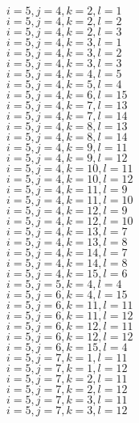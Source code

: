 \documentclass[14pt]{article}
\begin{document}
    $i=5,j=4,k=2,l=1 $ \\ 
    $i=5,j=4,k=2,l=2 $ \\ 
    $i=5,j=4,k=2,l=3 $ \\ 
    $i=5,j=4,k=3,l=1 $ \\ 
    $i=5,j=4,k=3,l=2 $ \\ 
    $i=5,j=4,k=3,l=3 $ \\ 
    $i=5,j=4,k=4,l=5 $ \\ 
    $i=5,j=4,k=5,l=4 $ \\ 
    $i=5,j=4,k=6,l=15 $ \\ 
    $i=5,j=4,k=7,l=13 $ \\ 
    $i=5,j=4,k=7,l=14 $ \\ 
    $i=5,j=4,k=8,l=13 $ \\ 
    $i=5,j=4,k=8,l=14 $ \\ 
    $i=5,j=4,k=9,l=11 $ \\ 
    $i=5,j=4,k=9,l=12 $ \\ 
    $i=5,j=4,k=10,l=11 $ \\ 
    $i=5,j=4,k=10,l=12 $ \\ 
    $i=5,j=4,k=11,l=9 $ \\ 
    $i=5,j=4,k=11,l=10 $ \\ 
    $i=5,j=4,k=12,l=9 $ \\ 
    $i=5,j=4,k=12,l=10 $ \\ 
    $i=5,j=4,k=13,l=7 $ \\ 
    $i=5,j=4,k=13,l=8 $ \\ 
    $i=5,j=4,k=14,l=7 $ \\ 
    $i=5,j=4,k=14,l=8 $ \\ 
    $i=5,j=4,k=15,l=6 $ \\ 
    $i=5,j=5,k=4,l=4 $ \\ 
    $i=5,j=6,k=4,l=15 $ \\ 
    $i=5,j=6,k=11,l=11 $ \\ 
    $i=5,j=6,k=11,l=12 $ \\ 
    $i=5,j=6,k=12,l=11 $ \\ 
    $i=5,j=6,k=12,l=12 $ \\ 
    $i=5,j=6,k=15,l=4 $ \\ 
    $i=5,j=7,k=1,l=11 $ \\ 
    $i=5,j=7,k=1,l=12 $ \\ 
    $i=5,j=7,k=2,l=11 $ \\ 
    $i=5,j=7,k=2,l=12 $ \\ 
    $i=5,j=7,k=3,l=11 $ \\ 
    $i=5,j=7,k=3,l=12 $ \\ 
\end{document}
